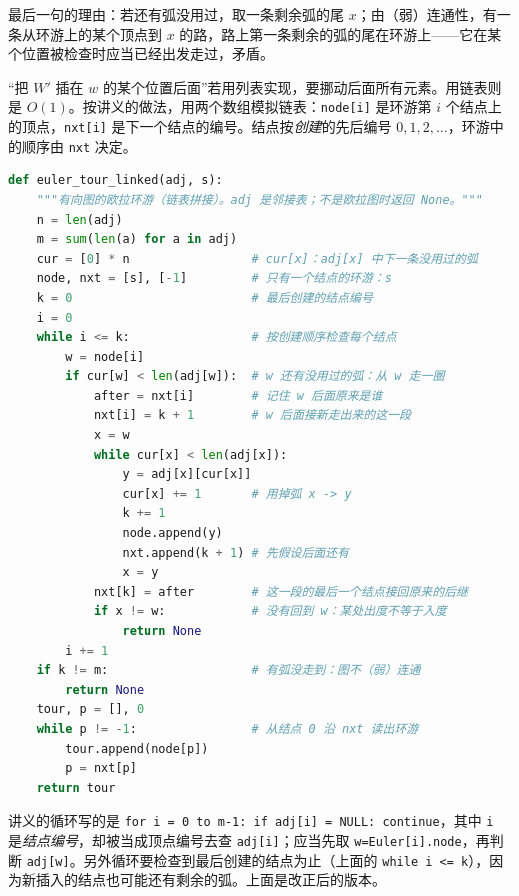最后一句的理由：若还有弧没用过，取一条剩余弧的尾 $x$；由（弱）连通性，有一条从环游上的某个顶点到 $x$ 的路，路上第一条剩余的弧的尾在环游上——它在某个位置被检查时应当已经出发走过，矛盾。


“把 $W'$ 插在 $w$ 的某个位置后面”若用列表实现，要挪动后面所有元素。用链表则是 $O(1)$。按讲义的做法，用两个数组模拟链表：\texttt{node[i]} 是环游第 $i$ 个结点上的顶点，\texttt{nxt[i]} 是下一个结点的编号。结点按\emph{创建}的先后编号 $0,1,2,\dots$，环游中的顺序由 \texttt{nxt} 决定。

\begin{lstlisting}[language=Python]
def euler_tour_linked(adj, s):
    """有向图的欧拉环游（链表拼接）。adj 是邻接表；不是欧拉图时返回 None。"""
    n = len(adj)
    m = sum(len(a) for a in adj)
    cur = [0] * n                 # cur[x]：adj[x] 中下一条没用过的弧
    node, nxt = [s], [-1]         # 只有一个结点的环游：s
    k = 0                         # 最后创建的结点编号
    i = 0
    while i <= k:                 # 按创建顺序检查每个结点
        w = node[i]
        if cur[w] < len(adj[w]):  # w 还有没用过的弧：从 w 走一圈
            after = nxt[i]        # 记住 w 后面原来是谁
            nxt[i] = k + 1        # w 后面接新走出来的这一段
            x = w
            while cur[x] < len(adj[x]):
                y = adj[x][cur[x]]
                cur[x] += 1       # 用掉弧 x -> y
                k += 1
                node.append(y)
                nxt.append(k + 1) # 先假设后面还有
                x = y
            nxt[k] = after        # 这一段的最后一个结点接回原来的后继
            if x != w:            # 没有回到 w：某处出度不等于入度
                return None
        i += 1
    if k != m:                    # 有弧没走到：图不（弱）连通
        return None
    tour, p = [], 0
    while p != -1:                # 从结点 0 沿 nxt 读出环游
        tour.append(node[p])
        p = nxt[p]
    return tour
\end{lstlisting}

\begin{remark}
讲义的循环写的是 \texttt{for i = 0 to m-1: if adj[i] = NULL: continue}，其中 \texttt{i} 是\emph{结点编号}，却被当成顶点编号去查 \texttt{adj[i]}；应当先取 \texttt{w=Euler[i].node}，再判断 \texttt{adj[w]}。另外循环要检查到最后创建的结点为止（上面的 \texttt{while i <= k}），因为新插入的结点也可能还有剩余的弧。上面是改正后的版本。
\end{remark}

